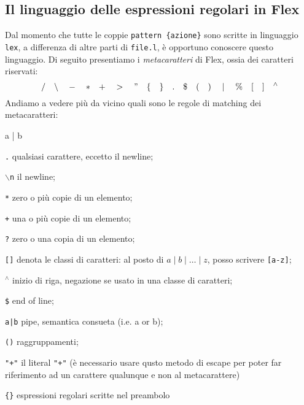 \documentclass[class=book, crop=false, oneside, 12pt]{standalone}
\begin{document}
\subsection{Il linguaggio delle espressioni regolari in Flex}
Dal momento che tutte le coppie \texttt{pattern \{azione\}} sono scritte in linguaggio \texttt{lex}, a differenza di altre parti di \texttt{file.l}, è opportuno conoscere questo linguaggio. Di seguito presentiamo i \emph{metacaratteri} di Flex, ossia dei caratteri riservati:
\begin{equation*}
    \slash \quad \backslash \quad - \quad * \quad + \quad >\quad " \quad \{ \quad \} \quad . \quad \$ \quad ( \quad ) \quad \mid \quad \% \quad [ \quad ] \quad ^\wedge
\end{equation*}
\noindent Andiamo a vedere più da vicino quali sono le regole di matching dei metacaratteri:
\begin{labeling}{a | b}
    \item[\texttt{.}] qualsiasi carattere, eccetto il newline;
    \item[\texttt{\(\backslash\)n}] il newline;
    \item[\texttt{*}] zero o più copie di un elemento;
    \item[\texttt{+}] una o più copie di un elemento;
    \item[\texttt{?}] zero o una copia di un elemento;
    \item[\texttt{[]}] denota le classi di caratteri: al posto di \(a \mid b \mid \ldots \mid z\), posso scrivere \texttt{[a-z]};
    \item[\texttt{\(^\wedge\)}] inizio di riga, negazione se usato in una classe di caratteri;
    \item[\texttt{\$}] end of line;
    \item[\texttt{a|b}] pipe, semantica consueta  (i.e. a or b);
    \item[\texttt{()}] raggruppamenti;
    \item[\texttt{"+"}] il literal \texttt{"+"} (è necessario usare qusto metodo di escape per poter far riferimento ad un carattere qualunque e non al metacarattere)
    \item[\texttt{\{\}}] espressioni regolari scritte nel preambolo
\end{labeling}
\end{document}
